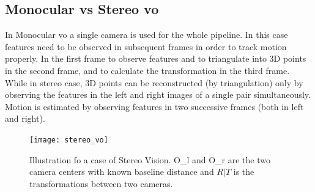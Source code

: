 \subsection{Monocular vs Stereo \acrshort{vo} }
In Monocular \acrshort{vo} a single camera is used for the whole pipeline. In this case features need to be observed in subsequent frames in order to track motion properly. In the first frame to observe features and to triangulate into 3D points in the second frame, and to calculate the transformation in the third frame\cite{KhalidYousif-et-al-2015}. While in stereo case, 3D points can be reconstructed (by triangulation) only by observing the features in the left and right images of a single pair simultaneously. Motion is estimated by observing features in two successive frames (both in left and right). 


\begin{figure}[h]
	\centering
	\texttt{[image: stereo\_vo]}
	\caption{ Illustration fo a case of Stereo Vision. O_{l} and O_{r} are the two camera centers with known baseline distance and $ R|T $ is the transformations between two cameras.}
	\label{fig:stereo_vo}
\end{figure}





